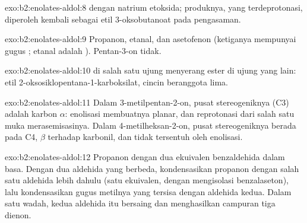 \begin{solution}{exo:b2:enolates-aldol:8}
 dengan natrium etoksida; produknya,
yang terdeprotonasi, diperoleh kembali sebagai etil 3-oksobutanoat pada
pengasaman.
\end{solution}

\begin{solution}{exo:b2:enolates-aldol:9}
Propanon, etanal, dan asetofenon (ketiganya mempunyai gugus ;
etanal adalah ). Pentan-3-on tidak.
\end{solution}

\begin{solution}{exo:b2:enolates-aldol:10}
 di salah satu ujung menyerang ester di ujung yang lain: etil
2-oksosiklopentana-1-karboksilat, cincin beranggota lima.
\end{solution}

\begin{solution}{exo:b2:enolates-aldol:11}
Dalam 3-metilpentan-2-on, pusat stereogeniknya (C3) adalah karbon $\alpha$:
enolisasi membuatnya planar, dan reprotonasi dari salah satu muka
merasemisasinya. Dalam 4-metilheksan-2-on, pusat stereogeniknya berada pada
C4, $\beta$ terhadap karbonil, dan tidak tersentuh oleh enolisasi.
\end{solution}

\begin{solution}{exo:b2:enolates-aldol:12}
Propanon dengan dua ekuivalen benzaldehida dalam basa. Dengan dua aldehida
yang berbeda, kondensasikan propanon dengan salah satu aldehida lebih
dahulu (satu ekuivalen, dengan mengisolasi benzalaseton), lalu
kondensasikan gugus metilnya yang tersisa dengan aldehida kedua. Dalam satu
wadah, kedua aldehida itu bersaing dan menghasilkan campuran tiga dienon.
\end{solution}


